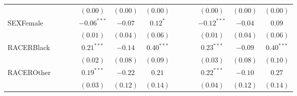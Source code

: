 \documentclass[12pt,twoside]{reedthesis}
\begin{document}
\begin{table}
\begin{center}
\begin{tiny}
\begin{tabular}{l@{} c@{} c@{} c@{} c@{} c@{} c@{} c@{} c@{} c@{} c@{} c@{} c@{} }
                                     &                        &                        &                        & $(0.00)$               & $(0.00)$               & $(0.00)$               &                        &                        &                        & $(0.00)$               & $(0.00)$               & $(0.00)$               \\
  SEXFemale                          &                        &                        &                        & $\mathbf{-0.06}^{***}$ & $-0.07$                & $0.12^{*}$             &                        &                        &                        & $\mathbf{-0.12}^{***}$ & $-0.04$                & $0.09$                 \\
                                     &                        &                        &                        & $(0.01)$               & $(0.04)$               & $(0.06)$               &                        &                        &                        & $(0.01)$               & $(0.04)$               & $(0.06)$               \\
  RACERBlack                         &                        &                        &                        & $\mathbf{0.21}^{***}$  & $-0.14$                & $\mathbf{0.40}^{***}$  &                        &                        &                        & $\mathbf{0.23}^{***}$  & $-0.09$                & $\mathbf{0.40}^{***}$  \\
                                     &                        &                        &                        & $(0.02)$               & $(0.08)$               & $(0.09)$               &                        &                        &                        & $(0.03)$               & $(0.08)$               & $(0.10)$               \\
  RACEROther                         &                        &                        &                        & $\mathbf{0.19}^{***}$  & $-0.22$                & $0.21$                 &                        &                        &                        & $\mathbf{0.22}^{***}$  & $-0.10$                & $0.27$                 \\
                                     &                        &                        &                        & $(0.03)$               & $(0.12)$               & $(0.14)$               &                        &                        &                        & $(0.04)$               & $(0.12)$               & $(0.14)$               \\

\end{tabular}
\end{tiny}
\end{center}
\end{table}
\end{document}
